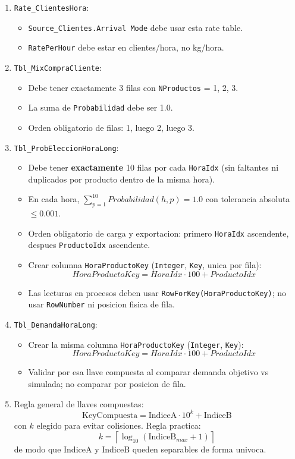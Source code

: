 \documentclass[11pt]{article}
\newcommand{\simio}[1]{\texttt{#1}}
\newcommand{\tabla}[1]{\texttt{#1}}
\newcommand{\state}[1]{\texttt{#1}}
\begin{document}
\begin{enumerate}
  \item \tabla{Rate\_ClientesHora}:
  \begin{itemize}
    \item \simio{Source\_Clientes.Arrival Mode} debe usar esta rate table.
    \item \simio{RatePerHour} debe estar en clientes/hora, no kg/hora.
  \end{itemize}
  \item \tabla{Tbl\_MixCompraCliente}:
  \begin{itemize}
    \item Debe tener exactamente 3 filas con \state{NProductos} = 1, 2, 3.
    \item La suma de \state{Probabilidad} debe ser 1.0.
    \item Orden obligatorio de filas: 1, luego 2, luego 3.
  \end{itemize}
  \item \tabla{Tbl\_ProbEleccionHoraLong}:
  \begin{itemize}
    \item Debe tener \textbf{exactamente} 10 filas por cada \state{HoraIdx} (sin faltantes ni duplicados por producto dentro de la misma hora).
    \item En cada hora, \(\sum_{p=1}^{10} Probabilidad(h,p) = 1.0\) con tolerancia absoluta \(\le 0.001\).
    \item Orden obligatorio de carga y exportacion: primero \state{HoraIdx} ascendente, despues \state{ProductoIdx} ascendente.
    \item Crear columna \state{HoraProductoKey} (\simio{Integer}, \simio{Key}, unica por fila):
    \[
    HoraProductoKey = HoraIdx \cdot 100 + ProductoIdx
    \]
    \item Las lecturas en procesos deben usar \state{RowForKey(HoraProductoKey)}; no usar \state{RowNumber} ni posicion fisica de fila.
  \end{itemize}
  \item \tabla{Tbl\_DemandaHoraLong}:
  \begin{itemize}
    \item Crear la misma columna \state{HoraProductoKey} (\simio{Integer}, \simio{Key}):
    \[
    HoraProductoKey = HoraIdx \cdot 100 + ProductoIdx
    \]
    \item Validar por esa llave compuesta al comparar demanda objetivo vs simulada; no comparar por posicion de fila.
  \end{itemize}
  \item Regla general de llaves compuestas:
  \[
  \text{KeyCompuesta} = \text{IndiceA} \cdot 10^k + \text{IndiceB}
  \]
  con \(k\) elegido para evitar colisiones. Regla practica:
  \[
  k = \left\lceil \log_{10}(\text{IndiceB}_{max}+1)\right\rceil
  \]
  de modo que \(\text{IndiceA}\) y \(\text{IndiceB}\) queden separables de forma univoca.
\end{enumerate}
\end{document}
